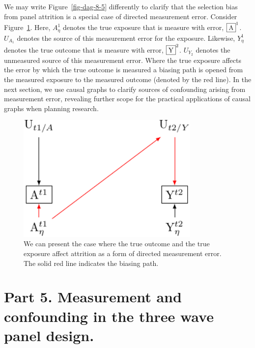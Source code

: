 \documentclass[
  singlecolumn]{report}
\begin{document}
We may write Figure~\ref{fig-dag-8-5} differently to clarify that the
selection bias from panel attrition is a special case of directed
measurement error. Consider Figure~\ref{fig-directed-measurement-error}.
Here, \(A^{1}_\eta\) denotes the true exposure that is measure with
error, \(\framebox{A}^{1}\). \(U_{A_1}\) denotes the source of this
measurement error for the exposure. Likewise, \(Y^{1}_\eta\) denotes the
true outcome that is measure with error, \(\framebox{Y}^{2}\).
\(U_{Y_2}\) denotes the unmeasured source of this measurement error.
Where the true exposure affects the error by which the true outcome is
measured a biasing path is opened from the measured exposure to the
measured outcome (denoted by the red line). In the next section, we use
causal graphs to clarify sources of confounding arising from measurement
error, revealing further scope for the practical applications of causal
graphs when planning research.

\begin{figure}

{\centering \includegraphics[width=0.8\textwidth,height=\textheight]{causal-dags_files/figure-pdf/fig-directed-measurement-error-1.pdf}

}

\caption{\label{fig-directed-measurement-error}We can present the case
where the true outcome and the true exposure affect attrition as a form
of directed measurement error. The solid red line indicates the biasing
path.}

\end{figure}

\hypertarget{part-5.-measurement-and-confounding-in-the-three-wave-panel-design.}{%
\section{Part 5. Measurement and confounding in the three wave panel
design.}\label{part-5.-measurement-and-confounding-in-the-three-wave-panel-design.}}
\end{document}
